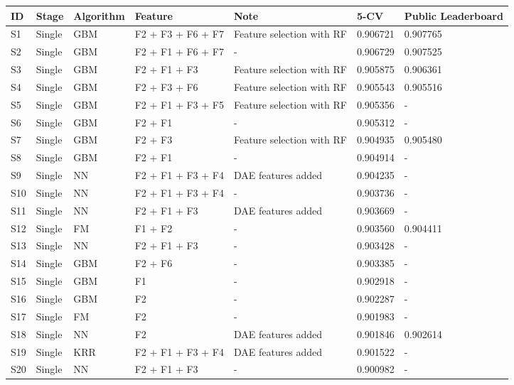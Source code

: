 \begin{table*}[t]
\begin{center}
    \begin{minipage}{\textwidth}
    {
      \small
      \hfill{}
\begin{tabular}{lllllll}
ID	& Stage	& Algorithm 	& Feature				& Note					& 5-CV		& Public Leaderboard \\ 
\hline
S1 	& Single	& GBM 		& F2 + F3 + F6 + F7		& Feature selection with RF	& 0.906721	& 0.907765 \\
S2 	& Single 	& GBM		& F2 + F1 + F6 + F7 		& -						& 0.906729	& 0.907525\\
S3 	& Single	& GBM  		& F2 + F1 + F3 			& Feature selection with RF	& 0.905875 	& 0.906361 \\
S4 	& Single	& GBM		& F2 + F3 + F6			& Feature selection with RF	& 0.905543	& 0.905516 \\
S5 	& Single	& GBM		& F2 + F1 + F3 + F5		& Feature selection with RF	& 0.905356	& - \\
S6	& Single	& GBM		& F2 + F1				& -						& 0.905312	& - \\
S7	& Single	& GBM		& F2 + F3				& Feature selection with RF	& 0.904935	& 0.905480 \\
S8	& Single	& GBM		& F2 + F1				& -						& 0.904914	& - \\
S9	& Single	& NN		& F2 + F1 + F3 + F4 		& DAE features	 added		& 0.904235 	& - \\
S10	& Single	& NN	 	& F2 + F1 + F3 + F4 		& -						& 0.903736 	& - \\
S11	& Single	& NN	 	& F2 + F1 + F3 			& DAE features	 added		& 0.903669	& - \\
S12	& Single	& FM 		& F1 + F2 			& -						& 0.903560	& 0.904411 \\
S13	& Single	& NN		& F2 + F1 + F3 			& -						& 0.903428	& - \\
S14	& Single	& GBM		& F2 + F6				& -						& 0.903385	& - \\
S15 	& Single	& GBM		& F1					& -						& 0.902918	& - \\
S16 	& Single	& GBM		& F2 				& - 						& 0.902287	& - \\
S17	& Single	& FM		& F2					& -						& 0.901983	& - \\
S18	& Single	& NN		& F2					& DAE features	 added		& 0.901846	& 0.902614 \\
S19	& Single	& KRR		& F2 + F1 + F3 + F4		& DAE features	 added		& 0.901522	& - \\
S20 	& Single	& NN		& F2 + F1 + F3 			& - 						& 0.900982	& - \\

\end{tabular}}
\end{minipage}
\end{center}
\end{table*}
